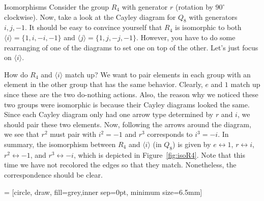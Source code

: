 \begin{section}{Isomorphisms}
Consider the group $R_4$ with generator $r$ (rotation by $90^\circ$ clockwise).  Now, take a look at the Cayley diagram for $Q_8$ with generators $i, j, -1$.  It should be easy to convince yourself that $R_4$ is isomorphic to both $\langle i\rangle=\{1,i,-i,-1\}$ and $\langle j\rangle=\{1,j,-j,-1\}$.  However, you have to do some rearranging of one of the diagrams to set one on top of the other.  Let's just focus on $\langle i\rangle$.  

How do $R_4$ and $\langle i\rangle$ match up?  We want to pair elements in each group with an element in the other group that has the same behavior.  Clearly, $e$ and $1$ match up since these are the two do-nothing actions.  Also, the reason why we noticed these two groups were isomorphic is because their Cayley diagrams looked the same.  Since each Cayley diagram only had one arrow type determined by $r$ and $i$, we should pair these two elements.  Now, following the arrows around the diagram, we see that $r^2$ must pair with $i^2=-1$ and $r^3$ corresponds to $i^3=-i$.  In summary, the isomorphism between $R_4$ and $\langle i\rangle$ (in $Q_8$) is given by $e\leftrightarrow 1$, $r\leftrightarrow i$, $r^2\leftrightarrow -1$, and $r^3\leftrightarrow -i$, which is depicted in Figure~\ref{fig:isoR4}. Note that this time we have not recolored the edges so that they match.  Nonetheless, the correspondence should be clear.

 = [circle, draw, fill=grey,inner sep=0pt, minimum size=6.5mm]

\begin{figure}[!ht]
\centering
{}
\end{figure}
\end{section}

